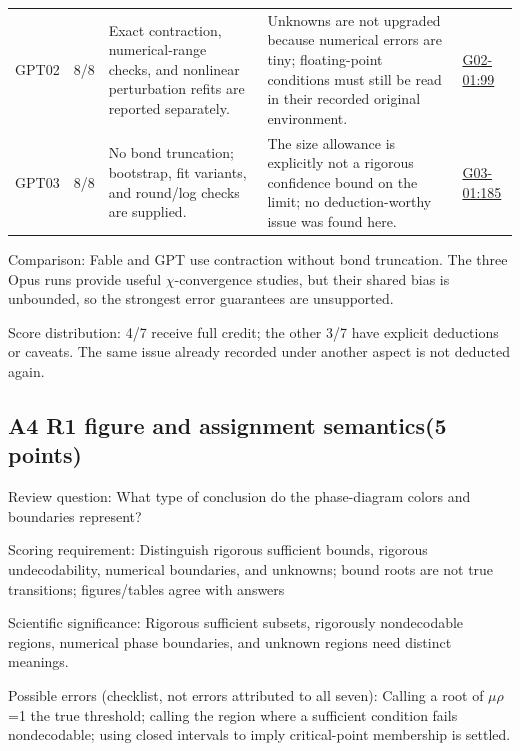 \documentclass[11pt,a4paper]{article}
\begin{document}
{\begin{longtable}
{}GPT02 & 8/\allowbreak{}8 & Exact contraction,\allowbreak{} numerical-range checks,\allowbreak{} and nonlinear perturbation refits are reported separately. & Unknowns are not upgraded because numerical errors are tiny; floating-point conditions must still be read in their recorded original environment. & \hyperref[src:G02-01]{G02-01:99}\tabularnewline
{}GPT03 & 8/\allowbreak{}8 & No bond truncation; bootstrap,\allowbreak{} fit variants,\allowbreak{} and round/\allowbreak{}log checks are supplied. & The size allowance is explicitly not a rigorous confidence bound on the limit; no deduction-worthy issue was found here. & \hyperref[src:G03-01]{G03-01:185}\tabularnewline
\bottomrule
\end{longtable}
}
Comparison: Fable and GPT use contraction without bond truncation. The three Opus runs provide useful \ensuremath{\chi}-convergence studies,\allowbreak{} but their shared bias is unbounded,\allowbreak{} so the strongest error guarantees are unsupported.

Score distribution: 4/\allowbreak{}7 receive full credit; the other 3/\allowbreak{}7 have explicit deductions or caveats. The same issue already recorded under another aspect is not deducted again.

\clearpage
\subsection{A4 R1 figure and assignment semantics(5 points)}
\label{aspect:A4}
Review question: What type of conclusion do the phase-diagram colors and boundaries represent?

Scoring requirement: Distinguish rigorous sufficient bounds,\allowbreak{} rigorous undecodability,\allowbreak{} numerical boundaries,\allowbreak{} and unknowns; bound roots are not true transitions; figures/\allowbreak{}tables agree with answers

Scientific significance: Rigorous sufficient subsets,\allowbreak{} rigorously nondecodable regions,\allowbreak{} numerical phase boundaries,\allowbreak{} and unknown regions need distinct meanings.

Possible errors (checklist,\allowbreak{} not errors attributed to all seven): Calling a root of \ensuremath{\mu}\ensuremath{\rho}=1 the true threshold; calling the region where a sufficient condition fails nondecodable; using closed intervals to imply critical-point membership is settled.
\end{document}
